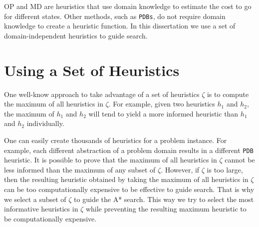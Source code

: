 OP and MD are heuristics that use domain knowledge to estimate the cost to go for different states. Other methods, such as \texttt{PDBs}, do not require domain knowledge to create a heuristic function. In this dissertation we use a set of domain-independent heuristics to guide search. 


%
%


\section{Using a Set of Heuristics}

One well-know approach to take advantage of a set of heuristics $\zeta$ is to compute the maximum of all heuristics in $\zeta$. For example, given two heuristics $h_1$ and $h_2$, the maximum of $h_1$ and $h_2$ will tend to yield a more informed heuristic than $h_1$ and $h_2$ individually.

One can easily create thousands of heuristics for a problem instance. For example, each different abstraction of a problem domain results in a different \texttt{PDB} heuristic. It is possible to prove that the maximum of all heuristics in $\zeta$ cannot be less informed than the maximum of any subset of $\zeta$. However, if $\zeta$ is too large, then the resulting heuristic obtained by taking the maximum of all heuristics in $\zeta$ can be too computationally expensive to be effective to guide search. That is why we select a subset of $\zeta$ to guide the A* search. This way we try to select the most informative heuristics in $\zeta$ while preventing the resulting maximum heuristic to be computationally expensive. 

